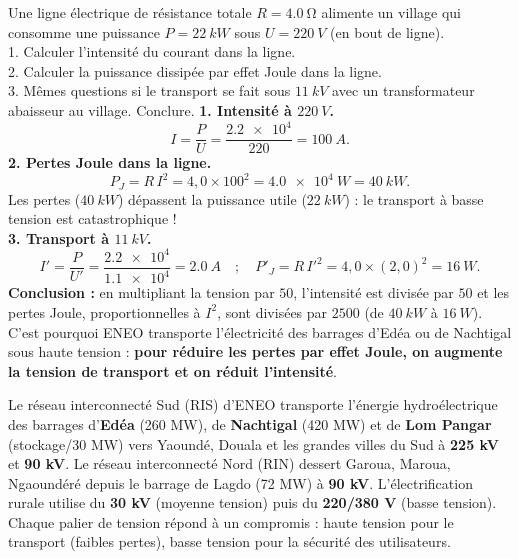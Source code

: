 \documentclass[11pt]{article}
\begin{document}
\begin{exoresolu}
Une ligne électrique de résistance totale $R = \SI{4,0}{\ohm}$ alimente un village qui consomme une puissance $P = \SI{22}{kW}$ sous $U = \SI{220}{V}$ (en bout de ligne).\\
1. Calculer l'intensité du courant dans la ligne.\\
2. Calculer la puissance dissipée par effet Joule dans la ligne.\\
3. Mêmes questions si le transport se fait sous $\SI{11}{kV}$ avec un transformateur abaisseur au village. Conclure.
\tcblower
\textbf{1. Intensité à $\SI{220}{V}$.}\\
\[ I = \dfrac{P}{U} = \dfrac{\num{2,2e4}}{220} = \SI{100}{A}. \]
\textbf{2. Pertes Joule dans la ligne.}
\[ P_J = R\,I^2 = 4{,}0 \times 100^2 = \SI{4,0e4}{W} = \SI{40}{kW}. \]
Les pertes ($\SI{40}{kW}$) dépassent la puissance utile ($\SI{22}{kW}$) : le transport à basse tension est catastrophique !\\
\textbf{3. Transport à $\SI{11}{kV}$.}\\
\[ I' = \dfrac{P}{U'} = \dfrac{\num{2,2e4}}{\num{1,1e4}} = \SI{2,0}{A} \quad ; \quad P'_J = R\,I'^2 = 4{,}0 \times (2{,}0)^2 = \SI{16}{W}. \]
\textbf{Conclusion :} en multipliant la tension par $50$, l'intensité est divisée par $50$ et les pertes Joule, proportionnelles à $I^2$, sont divisées par $2500$ (de $\SI{40}{kW}$ à $\SI{16}{W}$). C'est pourquoi ENEO transporte l'électricité des barrages d'Edéa ou de Nachtigal sous haute tension : \textbf{pour réduire les pertes par effet Joule, on augmente la tension de transport et on réduit l'intensité}.
\end{exoresolu}

\begin{savaistu}
Le réseau interconnecté Sud (RIS) d'ENEO transporte l'énergie hydroélectrique des barrages d'\textbf{Edéa} (260 MW), de \textbf{Nachtigal} (420 MW) et de \textbf{Lom Pangar} (stockage/30 MW) vers Yaoundé, Douala et les grandes villes du Sud à \textbf{225 kV} et \textbf{90 kV}. Le réseau interconnecté Nord (RIN) dessert Garoua, Maroua, Ngaoundéré depuis le barrage de Lagdo (72 MW) à \textbf{90 kV}. L'électrification rurale utilise du \textbf{30 kV} (moyenne tension) puis du \textbf{220/380 V} (basse tension). Chaque palier de tension répond à un compromis : haute tension pour le transport (faibles pertes), basse tension pour la sécurité des utilisateurs.
\end{savaistu}
\end{document}

